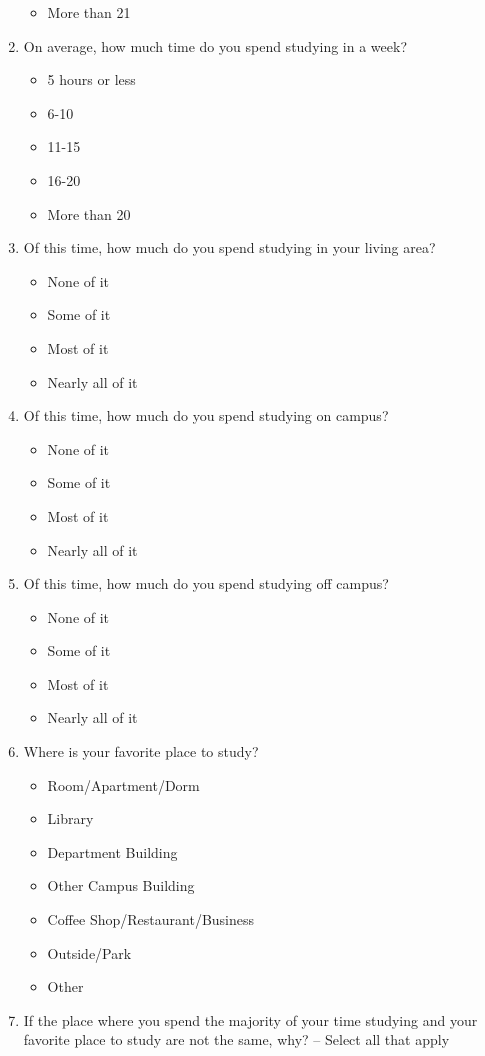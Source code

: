 \documentclass[10pt,twocolumn]{article}
\begin{document}
\begin{enumerate}
\begin{itemize}
\item More than 21
\end{itemize}
\item On average, how much time do you spend studying in a week?
\begin{itemize}
\item 5 hours or less
\item 6-10
\item 11-15
\item 16-20
\item More than 20
\end{itemize}
\item Of this time, how much do you spend studying in your living area?
\begin{itemize}
\item None of it
\item Some of it
\item Most of it
\item Nearly all of it
\end{itemize}
\item Of this time, how much do you spend studying on campus?
\begin{itemize}
\item None of it
\item Some of it
\item Most of it
\item Nearly all of it
\end{itemize}
\item Of this time, how much do you spend studying off campus?
\begin{itemize}
\item None of it
\item Some of it
\item Most of it
\item Nearly all of it
\end{itemize}
\item Where is your favorite place to study?
\begin{itemize}
\item Room/Apartment/Dorm
\item Library
\item Department Building
\item Other Campus Building
\item Coffee Shop/Restaurant/Business
\item Outside/Park
\item Other
\end{itemize}
\item If the place where you spend the majority of your time studying and your favorite place to study are not the same, why? -- Select all that apply

\end{enumerate}
\end{document}
